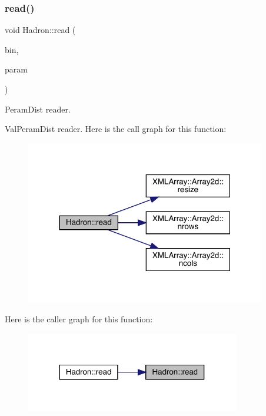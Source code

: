 \subsubsection{\texorpdfstring{read()}{read()}\hspace{0.1cm}{\footnotesize\ttfamily [69/94]}}
{\footnotesize\ttfamily void Hadron\+::read (\begin{DoxyParamCaption}\item[{\mbox{\hyperlink{classADATIO_1_1BinaryReader}{Binary\+Reader}} \&}]{bin,  }\item[{\mbox{\hyperlink{structHadron_1_1ValPeramDist__t}{Val\+Peram\+Dist\+\_\+t}} \&}]{param }\end{DoxyParamCaption})}



Peram\+Dist reader. 

Val\+Peram\+Dist reader. Here is the call graph for this function\+:\nopagebreak
\begin{figure}[H]
\begin{center}
\leavevmode
\includegraphics[width=297pt]{d1/daf/namespaceHadron_a030f71bff6ae10166b42e24845e0dbf8_cgraph}
\end{center}
\end{figure}
Here is the caller graph for this function\+:\nopagebreak
\begin{figure}[H]
\begin{center}
\leavevmode
\includegraphics[width=265pt]{d1/daf/namespaceHadron_a030f71bff6ae10166b42e24845e0dbf8_icgraph}
\end{center}
\end{figure}
\mbox{\label{namespaceHadron_a2aedc52f1b4f522f0fc13bbf7426e727}} 
